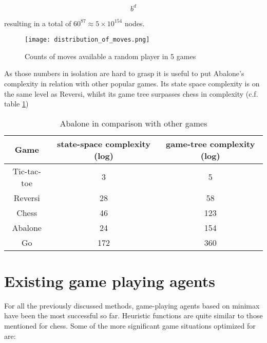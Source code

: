 \begin{equation}
    b^d
\end{equation}

resulting in a total of $60^{87} \approx 5 \times 10^{154}$ nodes. \cite{lemmens_constructing_2005}

\begin{figure}
    \centering
    \texttt{[image: distribution\_of\_moves.png]}
    \caption{Counts of moves available a random player in 5 games}
    \label{branching_factor}
\end{figure}

As those numbers in isolation are hard to grasp it is useful to put Abalone's complexity in relation with other popular games. Its state space complexity is on the same level as Reversi, whilst its game tree surpasses chess in complexity (c.f. table \ref{complexity_table})

\begin{table}
    \begin{center}
        \begin{tabular}{  c | c | c  }
            Game        & state-space complexity (log) & game-tree complexity (log) \\
            \hline
            \hline
            Tic-tac-toe & 3                            & 5                          \\
            Reversi     & 28                           & 58                         \\
            Chess       & 46                           & 123                        \\
            Abalone     & 24                           & 154                        \\
            Go          & 172                          & 360                        \\
        \end{tabular}
    \end{center}
    \caption{Abalone in comparison with other games \cite{chorus_implementing_2009}}
    \label{complexity_table}
\end{table}

\section{Existing game playing agents}
\label{existing_game_playing_agents}
For all the previously discussed methods, game-playing agents based on minimax have been the most successful so far. Heuristic functions are quite similar to those mentioned for chess. Some of the more significant game situations optimized for are:

